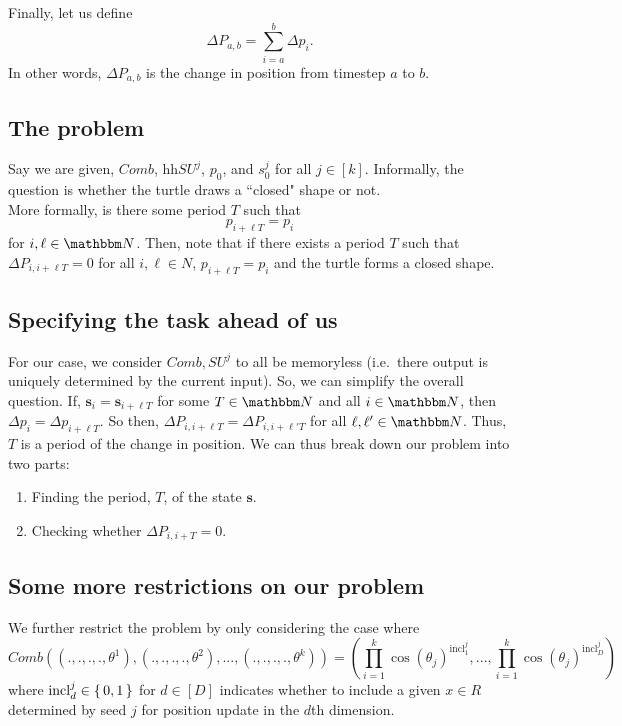 \documentclass[11pt,titlepage]{article}
\begin{document}
Finally, let us define
$$
  \Delta P_{a, b} = \sum_{i = a}^{b} \Delta p_i.
$$
In other words, $\Delta P_{a, b}$ is the change in position from timestep $a$ to $b$.

\subsection{The problem}
Say we are given, $Comb$, hh$SU^j$, $p_0$, and $s^j_0$ for all $j \in [k]$.
Informally, the question is whether the turtle draws a ``closed" shape or not.\\
More formally, is there some period $T$ such that 
$$
  p_{i + \ell T} = p_{i}
$$
for $i, \ell \in \N$.
Then, note that if there exists a period $T$ such that 
$\Delta P_{i, i + \ell T} = 0$ for all $i, \ell \in N$, 
$p_{i + \ell T} = p_{i}$ and the turtle forms a closed shape.


\subsection{Specifying the task ahead of us}
For our case, we consider $Comb, SU^j$ to all be memoryless (i.e.\ there output
is uniquely determined by the current input). So, we can simplify the overall question.
If, $\pmb{s}_i = \pmb{s}_{i + \ell T}$ for some $T \in \N$ and all $i \in \N$, then 
$\Delta p_{i} = \Delta p_{i + \ell T}$. So then,
$\Delta P_{i, i + \ell T} = \Delta P_{i, i + \ell' T}$ for all $\ell, \ell' \in \N$.
Thus, $T$ is a period of the change in position. We can thus
break down our problem into two parts:
\begin{enumerate}
  \item Finding the period, $T$, of the state $\pmb{s}$.
  \item Checking whether $\Delta P_{i, i + T} = 0$.
\end{enumerate}

\subsection{Some more restrictions on our problem}
We further restrict the problem by only considering the case where
$$
  Comb((., ., ., ., \theta^1), (., ., ., ., \theta^2), ..., (., ., ., ., \theta^k)) =
    \left(\prod_{i=1}^k \cos(\theta_j) ^ {\mathrm{incl}_1^j}, ..., \prod_{i=1}^k \cos(\theta_j) ^ {\mathrm{incl}_D^j}\right)
$$
where $\mathrm{incl}_d^j \in \set{0, 1}$ for $d \in [D]$ indicates whether to include a given
$x \in R$ determined by seed $j$ for position update in the $d$th dimension.
\end{document}

